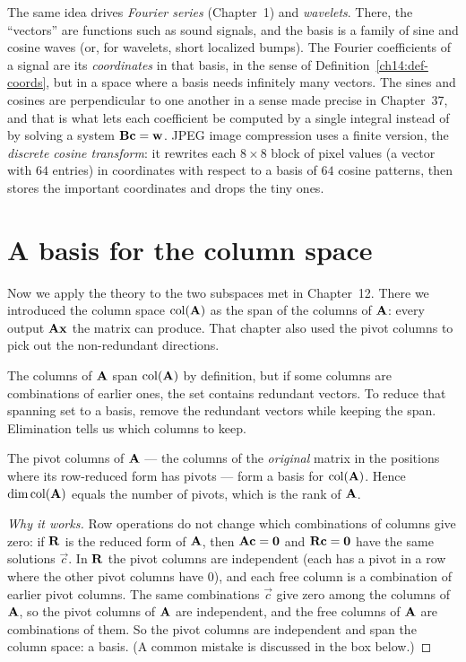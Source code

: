 \begin{connectionbox}
The same idea drives \emph{Fourier series} (Chapter~1) and \emph{wavelets}. There, the
``vectors'' are functions such as sound signals, and the basis is a family of sine and cosine waves (or,
for wavelets, short localized bumps). The Fourier coefficients of a signal are its
\emph{coordinates} in that basis, in the sense of Definition~\ref{ch14:def-coords},
but in a space where a basis needs infinitely many vectors. The sines and cosines are
perpendicular to one another in a sense made precise in Chapter~37, and that is
what lets each coefficient be computed by a single integral instead of by solving
a system $\mathbf{B}\mathbf{c}=\mathbf{w}$. JPEG image compression uses a finite version,
the \emph{discrete cosine transform}: it rewrites each $8\times 8$ block of pixel
values (a vector with $64$ entries) in coordinates with respect to a basis of $64$
cosine patterns, then stores the important coordinates and drops the tiny ones.
\end{connectionbox}

\section{A basis for the column space}
\label{ch14:colbasis}

Now we apply the theory to the two subspaces met in Chapter~12. There we introduced the column space $\operatorname{col}(\mathbf{A})$ as the span
of the columns of $\mathbf{A}$: every output $\mathbf{A}\mathbf{x}$ the matrix can produce.
That chapter also used the pivot columns to pick out the non-redundant directions.

The columns of $\mathbf{A}$ span $\operatorname{col}(\mathbf{A})$ by definition, but if some columns
are combinations of earlier ones, the set contains redundant vectors. To reduce
that spanning set to a basis, remove the redundant vectors while keeping
the span. Elimination tells us which columns to keep.

\begin{theorem}
\label{ch14:thm-colbasis}
The pivot columns of $\mathbf{A}$ --- the columns of the \emph{original} matrix in
the positions where its row-reduced form has pivots --- form a basis for
$\operatorname{col}(\mathbf{A})$. Hence $\operatorname{dim} \operatorname{col}(\mathbf{A})$ equals the number of pivots, which is
the rank of $\mathbf{A}$.
\end{theorem}

\begin{proof}[Why it works]
Row operations do not change which combinations of columns give zero: if $\mathbf{R}$
is the reduced form of $\mathbf{A}$, then $\mathbf{A}\mathbf{c}=\mathbf{0}$ and
$\mathbf{R}\mathbf{c}=\mathbf{0}$ have the same solutions $\vec{c}$. In $\mathbf{R}$ the
pivot columns are independent (each has a pivot in a row where the other pivot
columns have $0$), and each free column is a combination of earlier pivot columns. The same
combinations $\vec{c}$ give zero among the columns of $\mathbf{A}$, so the
pivot columns of $\mathbf{A}$ are independent, and the free columns of $\mathbf{A}$ are
combinations of them. So the pivot columns are independent and span the column space: a basis. (A
common mistake is discussed in the box below.)
\end{proof}

